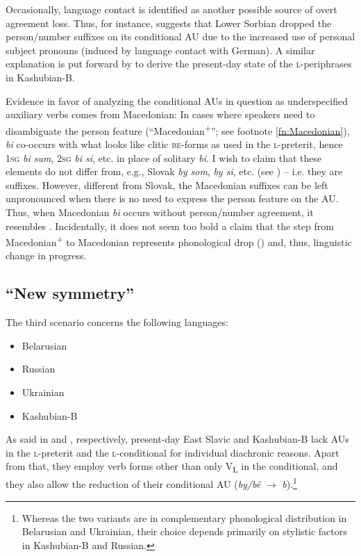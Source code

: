 \documentclass[output=paper]{langscibook}
\begin{document}
Occasionally, language contact is identified as another possible source of overt agreement loss. Thus, for instance, \citet[24]{Panzer1967} suggests that Lower Sorbian dropped the person/number suffixes on its conditional AU due to the increased use of personal subject pronouns (induced by language contact with German). A similar explanation is put forward by \citet[100]{Rittel1970} to derive the present-day state of the \textsc{l-}periphrases in Kashubian-B.

Evidence in favor of analyzing the conditional AUs in question as underspecified auxiliary verbs comes from Macedonian: In cases where speakers need to disambiguate the person feature (``Macedonian\textsuperscript{+}''; see footnote \ref{fn:Macedonian}), \textit{bi} co-occurs with what looks like clitic \textsc{be}-forms as used in the \textsc{l-}preterit, hence \textsc{1sg} \textit{bi sum}, \textsc{2sg} \textit{bi si}, etc. in place of solitary \textit{bi}. I wish to claim that these elements do not differ from, e.g., Slovak \textit{by som}, \textit{by si}, etc. (see ) -- i.e. they are suffixes. However, different from Slovak, the Macedonian suffixes can be left unpronounced when there is no need to express the person feature on the AU. Thus, when Macedonian \textit{bi} occurs without person/number agreement, it resembles . Incidentally, it does not seem too bold a claim that the step from Macedonian\textsuperscript{+} to Macedonian represents phonological drop () and, thus, linguistic change in progress.

\largerpage[-1]


\subsection{``New symmetry''}\label{pitsch:sec:new_symmetry}

The third scenario concerns the following languages:

\begin{itemize}
    \item Belarusian
    \item Russian
    \item Ukrainian
    \item Kashubian-B
\end{itemize}
    
\noindent As said in  and , respectively, present-day East Slavic and Kashubian-B lack AUs in the \textsc{l-}preterit and the \textsc{l-}conditional for individual diachronic reasons. Apart from that, they employ verb forms other than only V\textsubscript{L} in the conditional, and they also allow the reduction of their conditional AU (\textit{by/bë} $\rightarrow$ \textit{b}).\footnote{Whereas the two variants are in complementary phonological distribution in Belarusian and Ukrainian, their choice depends primarily on stylistic factors in Kashubian-B and Russian.}
\end{document}
